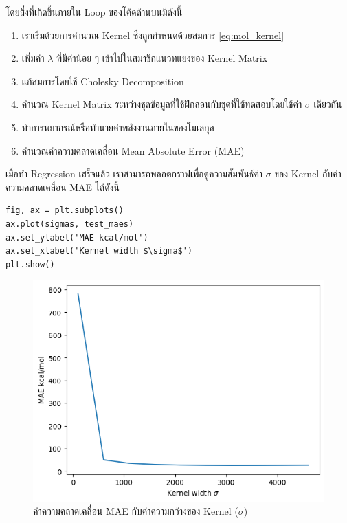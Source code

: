 โดยสิ่งที่เกิดขึ้นภายใน Loop ของโค้ดด้านบนมีดังนี้

\begin{enumerate}[noitemsep]
    \item เราเริ่มด้วยการคำนวณ Kernel ซึ่งถูกกำหนดด้วยสมการ \ref{eq:mol_kernel}
    
    \item เพิ่มค่า $\lambda$ ที่มีค่าน้อย ๆ เข้าไปในสมาชิกแนวทแยงของ Kernel Matrix
    
    \item แก้สมการโดยใช้ Cholesky Decomposition
    
    \item คำนวณ Kernel Matrix ระหว่างชุดข้อมูลที่ใช้ฝึกสอนกับชุดที่ใช้ทดสอบโดยใช้ค่า $\sigma$ เดียวกัน
    
    \item ทำการพยากรณ์หรือทำนายค่าพลังงานภายในของโมเลกุล
    
    \item คำนวณค่าความคลาดเคลื่อน Mean Absolute Error (MAE)
\end{enumerate}

เมื่อทำ Regression เสร็จแล้ว เราสามารถพลอตกราฟเพื่อดูความสัมพันธ์ค่า $\sigma$ ของ Kernel กับค่าความคลาดเคลื่อน MAE ได้ดังนี้

\begin{lstlisting}[style=MyPython]
fig, ax = plt.subplots()
ax.plot(sigmas, test_maes)
ax.set_ylabel('MAE kcal/mol')
ax.set_xlabel('Kernel width $\sigma$')
plt.show()
\end{lstlisting}

\begin{figure}[H]
    \centering
    \includegraphics[width=0.9\linewidth]{fig/qm9_cm_mae_sigma.png}
    \caption{ค่าความคลาดเคลื่อน MAE กับค่าความกว้างของ Kernel ($\sigma$)}
    \label{fig:qm9_cm_kernel_mae}
\end{figure}

